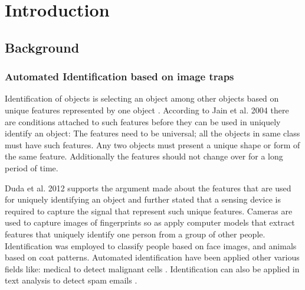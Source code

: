 %
%
%

\chapter{Introduction} %


\newcommand{\keyword}[1]{\textbf{#1}}
\newcommand{\tabhead}[1]{\textbf{#1}}
\newcommand{\code}[1]{\texttt{#1}}
\newcommand{\file}[1]{\texttt{\bfseries#1}}
\newcommand{\option}[1]{\texttt{\itshape#1}}


\section{Background} %

\subsection{Automated Identification based on image traps}

Identification of objects is selecting an object among other objects based on unique features represented by one object \cite{jain2007handbook}. According to Jain et al. 2004 \cite{jain2004introduction} there are conditions attached to such features before they can be used in uniquely identify an object: The features need to be universal; all the objects in same class must have such features. Any two objects must present a unique shape or form of the same feature. Additionally the features should not change over for a long period of time.

Duda et al. 2012 \cite{duda2012pattern} supports the argument made about the features that are used for uniquely identifying an object and further stated that a sensing device is required to capture the signal that represent such unique features. Cameras are used to capture images of fingerprints so as apply computer models that extract features that uniquely identify one person from a group of other people.
Identification was employed to classify people based on face images, and animals based on coat patterns. Automated identification have been applied other various fields like: medical to detect malignant cells \cite{khan2019novel}. Identification can also be applied in text analysis to detect spam emails \cite{faris2019intelligent}. 

